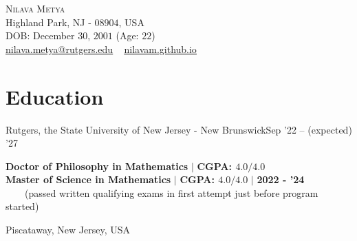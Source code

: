 
\usepackage{tabto}
\usepackage{setspace}
\usepackage{etaremune}
\usepackage{xcolor}
\newcommand*\circled[1]{\tikz[baseline=(char.base)]{
            \node[shape=circle,draw,inner sep=1pt, line width=1.1pt] (char) {#1};}}






\begin{center}\vspace{-20pt}
    {\Huge \scshape Nilava Metya} \\ %
    Highland Park, NJ - $08904$, USA\\
    DOB: December $30$, $2001$ (Age: $22$)\\ \vspace{1pt}
{\small 
\href{mailto:nilava.metya@rutgers.edu}{\circled{\scriptsize\faEnvelope}  \underline{nilava.metya@rutgers.edu}} ~ 
{\circled{\scriptsize\faHome} \underline{\url{nilavam.github.io}}}}
\end{center}



\section{Education}
\resumeSubheading
{Rutgers, the State University of New Jersey - New Brunswick}{Sep '22 -- (expected) '27}
{\begin{minipage}{15cm} \color{grey}\textbf{Doctor of Philosophy in Mathematics}  $|$ \textbf{CGPA: $4.0/4.0$}\\
\textbf{Master of Science in Mathematics}  $|$ \textbf{CGPA: $4.0/4.0$} $|$ \textbf{\color{black}2022 - '24}\\
$\phantom{\qquad}$(passed written qualifying exams in first attempt just before program started) \end{minipage}
}{Piscataway, New Jersey, USA}
\vspace{-7pt}

